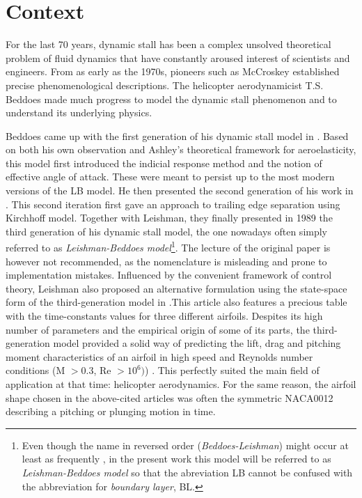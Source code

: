 \section{Context}
For the last 70 years, dynamic stall has been a complex unsolved theoretical problem of fluid dynamics that have constantly aroused interest of scientists and engineers. From as early as the 1970s, pioneers such as McCroskey \cite{mccroskey_dynamic_1976} established precise phenomenological descriptions. The helicopter aerodynamicist T.S. Beddoes made much progress to model the dynamic stall phenomenon and to understand its underlying physics. 

Beddoes came up with the first generation of his dynamic stall model in \cite{beddoes_synthesis_1976}. Based on both his own observation and Ashley's theoretical framework for aeroelasticity, this model first introduced the indicial response method and the notion of effective angle of attack. These were meant to persist up to the most modern versions of the LB model. He then presented the second generation of his work in \cite{beddoes_representation_1983}. This second iteration first gave an approach to  trailing edge separation using Kirchhoff model. Together with Leishman, they finally presented in 1989 the third generation of his dynamic stall model, the one nowadays often simply referred to  as \textit{Leishman-Beddoes model}\footnote{Even though the name in reversed order (\textit{Beddoes-Leishman}) might occur at least as frequently , in the present work this model will be referred to as \textit{Leishman-Beddoes model} so that the abreviation LB cannot be confused with the abbreviation for \textit{boundary layer}, BL.}. The  lecture of the original paper \cite{leishman_semi-empirical_1989} is however not recommended, as the nomenclature is misleading and prone to implementation mistakes. Influenced by the convenient framework of control theory, Leishman also proposed an alternative formulation using the state-space form of the third-generation model in \cite{leishman_state-space_1989}.This article also features a precious table with the time-constants values for three different airfoils. Despites its high number of parameters and the empirical origin of some of its parts, the third-generation model provided a solid way of predicting the lift, drag and pitching moment characteristics of an airfoil in high speed and Reynolds number conditions (M $>0.3$, Re $> 10^6)$) . This perfectly suited the main field of application at that time: helicopter aerodynamics. For the same reason, the airfoil shape chosen in the above-cited articles was often the symmetric NACA0012 describing a pitching or plunging motion in time. 

